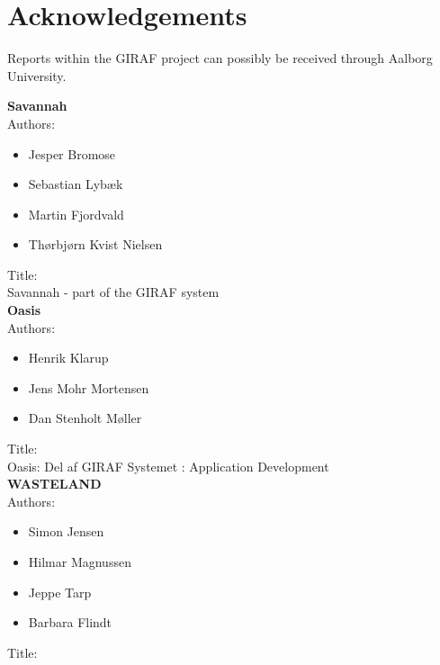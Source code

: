 \chapter{Acknowledgements}
\label{acknowledgement}
Reports within the GIRAF project can possibly be received through Aalborg University.   

\textbf{Savannah}\\
Authors:\\ 
\begin{itemize}
\item Jesper Bromose\\
\item Sebastian Lybæk\\
\item Martin Fjordvald\\
\item Thørbjørn Kvist Nielsen\\
\end{itemize}

Title:\\
Savannah - part of the GIRAF system\\

\textbf{Oasis}\\
Authors:\\
\begin{itemize}
\item Henrik Klarup\\
\item Jens Mohr Mortensen\\
\item Dan Stenholt Møller\\
\end{itemize}

Title:\\
Oasis: Del af GIRAF Systemet : Application Development\\


\textbf{WASTELAND}\\
Authors:\\
\begin{itemize}
\item Simon Jensen\\
\item Hilmar Magnussen\\
\item Jeppe Tarp\\
\item Barbara Flindt\\
\end{itemize}
Title:\\


